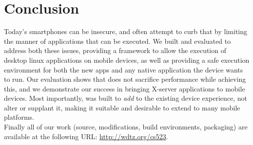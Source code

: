 \section{Conclusion}
\label{sec:conclusion}
Today's smartphones can be insecure, and often attempt to curb that by limiting the manner of applications that can be executed.  We built and evaluated \emph{\proj} to address both these issues, providing a framework to allow the execution of desktop linux applications on mobile devices, as well as providing a safe execution environment for both the new apps and any native application the device wants to run.  Our evaluation shows that \emph{\proj} does not sacrifice performance while achieving this, and we demonstrate our success in bringing X-server applications to mobile devices.  Most importantly, \emph{\proj} was built to \emph{add} to the existing device experience, not alter or supplant it, making it suitable and desirable to extend to many mobile platforms.\\

Finally all of our work (source, modifications, build environments, packaging) are available at the following URL: \url{http://wdtz.org/cs523}.
